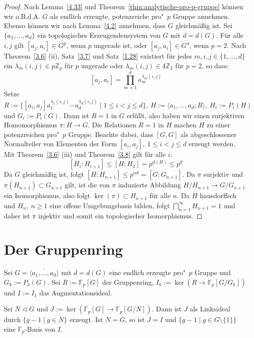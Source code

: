 \documentclass[11pt,a4paper,openany]{memoir}
\begin{document}
\begin{proof}
Nach Lemma~\ref{4.33} und Theorem~\ref{thm:analytische-pro-p-gruppe} können wir o.B.d.A. $G$ als endlich erzeugte, potenzreiche pro"~$p$ Gruppe annehmen. Ebenso können wir nach Lemma~\ref{4.2} annehmen, dass $G$ gleichmäßig ist. Sei $\{a_1,\ldots,a_d\}$ ein topologisches Erzeugendensystem von $G$ mit $d=d(G)$. Für alle $i,j$ gilt $[a_j,a_i]\in\overline{G^p}$, wenn $p$ ungerade ist, oder $[a_j,a_i]\in\overline{G^4}$, wenn $p=2$. Nach Theorem~\ref{3.6} (ii), Satz~\ref{3.7} und Satz~\ref{1.28} existiert für jedes $m,i,j\in\{1,\ldots,d\}$ ein $\lambda_m(i,j)\in p\mathbb{Z}_p$ für $p$ ungerade oder $\lambda_m(i,j)\in 4\mathbb{Z}_2$ für $p=2$, so dass:
\[[a_j,a_i]=\prod_{m=1}^d a_m^{\lambda_m(i,j)} \]
Setze $R:=\{[a_i,a_j] a_1^{\lambda_1(i,j)}\cdots a_d^{\lambda_d(i,j)} \mid 1\leq i<j\leq d \},\ H:=\langle a_1,\ldots,a_d ; R\rangle,\ H_i:=P_i(H)$ und $G_i:=P_i(G)$. Dann ist $R=1$ in $G$ erfüllt, also haben wir einen surjektiven Homomorphismus $\pi:H\to G$. Die Relationen $R=1$ in $H$ machen $H$ zu einer potenzreichen pro"~$p$ Gruppe. Beachte dabei, dass $[G,G]$ als abgeschlossener Normalteiler von Elementen der Form $[a_i,a_j],\ 1\leq i<j\leq d$ erzeugt werden. Mit Theorem~\ref{3.6} (iii) und Theorem~\ref{3.8} gilt für alle $i$: 
\[[H_i:H_{i+1}]\leq [H:H_2]= p^{d(H)}\leq p^d\]
Da $G$ gleichmäßig ist, folgt $[H:H_{n+1}]\leq p^{nd}=[G:G_{n+1}]$. Da $\pi$ surjektiv und $\pi(H_{n+1})\subset G_{n+1}$ gilt, ist die von $\pi$ induzierte Abbildung $H/H_{n+1}\to G/G_{n+1}$ ein Isomorphismus, also folgt $\ker(\pi)\subset H_{n+1}$ für alle $n$. Da $H$ hausdorffsch und $H_n,\ n\geq 1$ eine offene Umgebungsbasis bilden, folgt $\bigcap_{n=1}^\infty H_{n+1}=1$ und daher ist $\pi$ injektiv und somit ein topologischer Isomorphismus.
\end{proof}
\fi

\section{Der Gruppenring}

Sei $G=\overline{\langle a_1,\ldots,a_d\rangle}$ mit $d=d(G)$ eine endlich erzeugte pro"~$p$ Gruppe und $G_k:=P_k(G)$. Sei $R:=\mathbb{F}_p[G]$ der Gruppenring, $I_k:=\ker(R\to \mathbb{F}_p[G/G_k])$ und $I:=I_1$ das Augmentationsideal.

\begin{lemma}\label{lemma:augmentation-ideal}
Sei $N\lhd G$ und $J:=\ker(\mathbb{F}_p[G]\to \mathbb{F}_p[G/N])$. Dann ist $J$ als Linksideal durch $\{g-1\mid g\in N\}$ erzeugt. Ist $N=G$, so ist $J=I$ und $\{g-1\mid g\in G\setminus\{1\}\}$ eine $\mathbb{F}_p$-Basis von $I$.
\end{lemma}
\end{document}
